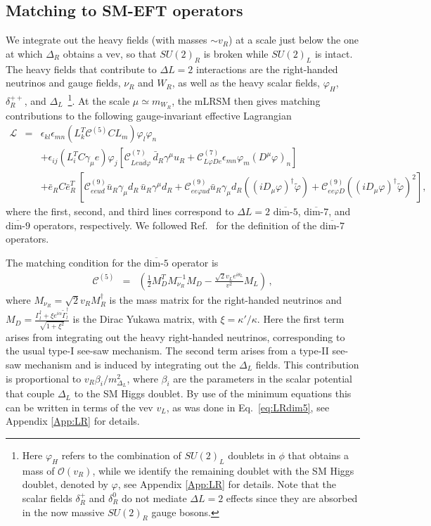 \documentclass[letterpaper,11pt]{article}
\newcommand{\al}{\alpha}
\newcommand{\bt}{\beta}
\newcommand{\dt}{\delta}
\newcommand{\ka}{\kappa}
\newcommand{\Dt}{\Delta}
\newcommand{\bea}{\begin{eqnarray}}
\newcommand{\eea}{\end{eqnarray}}
\newcommand{\Or}{\mathcal O}
\newcommand{\vp}{\varphi}
\newcommand{\sq}{^{2}}
\newcommand{\nn}{\nonumber}
\newcommand{\textoverline}[1]{$\overline{\mbox{#1}}$}
\begin{document}
\subsection{Matching to SM-EFT operators}
We integrate out the heavy fields (with masses $\sim v_R$)  at a scale just below the one at which
$\Dt_R$ obtains a vev, so  that $SU(2)_R$ is broken while $SU(2)_L$ is intact. The heavy fields that contribute to $\Dt L=2$ interactions are the right-handed neutrinos  and gauge fields, $\nu_R$ and  $W_R$, as well as the heavy scalar fields, $\vp_H$, $\dt_R^{++}$, and $\Dt_L$~\footnote{Here $\vp_H$ refers to the combination of $SU(2)_L$ doublets in $\phi$ that obtains a mass of $\Or(v_R)$, while we identify the remaining doublet with the SM Higgs doublet, denoted by $\vp$, see Appendix \ref{App:LR} for details. Note that the  scalar fields  $\dt_R^+$ and $\dt_R^0$ do not mediate $\Dt L=2$ effects since they are absorbed in the now massive $SU(2)_R$ gauge bosons.}. 
At the scale $\mu\simeq m_{W_R}$, the mLRSM then gives matching contributions to the following gauge-invariant effective Lagrangian
\bea\label{eq:LREFT}
\mathcal L &=&  \epsilon_{kl} \epsilon_{mn}\left(L_k^T  \mathcal C^{(5)}C L_m \right)\varphi_l \varphi_n \nn \\
&& +   \epsilon_{ij}(L_i^T C \gamma_\mu e)\varphi_j\left[ \mathcal C^{(7)}_{Leu\bar d  \varphi}\,\bar d_R \gamma^\mu u_R+ \mathcal  C^{(7)}_{L\varphi De}\epsilon_{mn} \varphi_m (D^\mu \varphi)_n\right] \\
&& + \bar e_R C \bar e_R^T\,\left[\mathcal C_{eeud}^{(9)} \bar u_R \gamma_\mu d_R\,  \bar u_R \gamma^\mu d_R + \mathcal  C_{ee\varphi u d}^{(9)} \bar u_R \gamma_\mu d_R 
( (i D_\mu \varphi)^\dagger  \tilde \varphi)
+ \mathcal C_{ee\varphi D}^{(9)}( (i D_\mu \varphi)^\dagger  \tilde \varphi)^2\right],\nn
\eea
where the first, second, and third lines correspond to $\Delta L=2$ \textoverline{dim-5}, \textoverline{dim-7}, and \textoverline{dim-9} operators, respectively. We followed Ref.~\cite{Cirigliano:2017djv} for the definition of the \textoverline{dim-7} operators. 

The matching condition for the  \textoverline{dim-5} operator is
\bea\label{eq:LRdim5}
\mathcal C^{(5)}& =&\left({\frac{1}{2}} M_D^T M_{\nu_R}^{-1}M_D-\frac{\sqrt{2}v_Le^{i\theta_L}}{v\sq}M_L\right)\,,
\eea
where  $M_{\nu_R} = \sqrt{2}v_R M_R^\dagger$ is the mass matrix for the right-handed neutrinos and $M_D =\frac{\Gamma^\dagger_l+\xi e^{i\al}\tilde \Gamma^\dagger_l}{\sqrt{1+\xi\sq}}$ is the Dirac Yukawa matrix, with $\xi=\ka'/\ka$. Here the first term arises from integrating out the heavy right-handed neutrinos, corresponding to the usual type-I see-saw mechanism. The second term arises from a type-II see-saw mechanism and is induced by integrating out the $\Dt_L$ fields. This contribution is proportional to $v_R \bt_i/m_{\Dt_L}\sq$, where $\bt_i$ are the parameters in the scalar potential that couple $\Dt_L$ to the SM Higgs doublet. By use of the minimum equations  this can be written in terms of the vev $v_L$, as was done in Eq.\ \eqref{eq:LRdim5}, see Appendix \ref{App:LR} for details.
\end{document}
